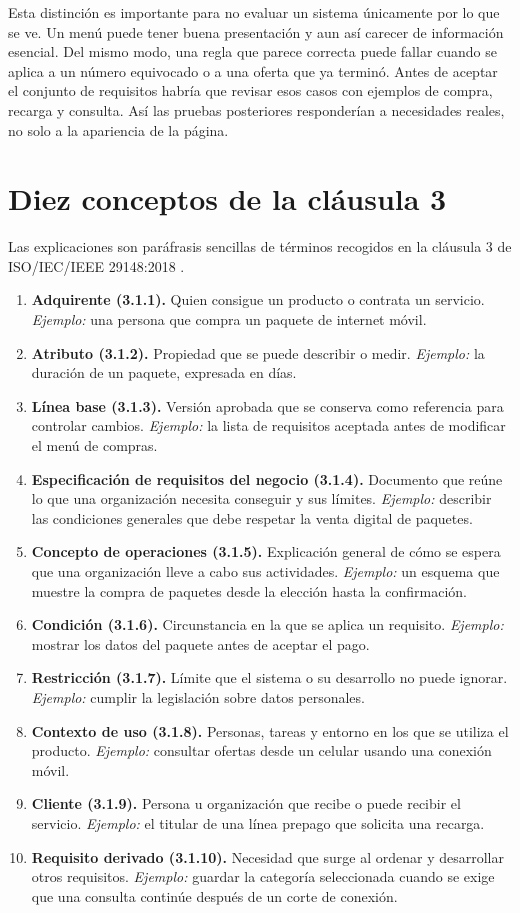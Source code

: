 \documentclass[12pt,a4paper]{article}
\begin{document}
Esta distinción es importante para no evaluar un sistema únicamente por lo que se ve. Un menú puede tener buena presentación y aun así carecer de información esencial. Del mismo modo, una regla que parece correcta puede fallar cuando se aplica a un número equivocado o a una oferta que ya terminó. Antes de aceptar el conjunto de requisitos habría que revisar esos casos con ejemplos de compra, recarga y consulta. Así las pruebas posteriores responderían a necesidades reales, no solo a la apariencia de la página.
\clearpage
\section{Diez conceptos de la cláusula 3}
Las explicaciones son paráfrasis sencillas de términos recogidos en la cláusula 3 de ISO/IEC/IEEE 29148:2018 \cite{ieee29148}.
\begin{enumerate}
\item \textbf{Adquirente (3.1.1).} Quien consigue un producto o contrata un servicio. \emph{Ejemplo:} una persona que compra un paquete de internet móvil.
\item \textbf{Atributo (3.1.2).} Propiedad que se puede describir o medir. \emph{Ejemplo:} la duración de un paquete, expresada en días.
\item \textbf{Línea base (3.1.3).} Versión aprobada que se conserva como referencia para controlar cambios. \emph{Ejemplo:} la lista de requisitos aceptada antes de modificar el menú de compras.
\item \textbf{Especificación de requisitos del negocio (3.1.4).} Documento que reúne lo que una organización necesita conseguir y sus límites. \emph{Ejemplo:} describir las condiciones generales que debe respetar la venta digital de paquetes.
\item \textbf{Concepto de operaciones (3.1.5).} Explicación general de cómo se espera que una organización lleve a cabo sus actividades. \emph{Ejemplo:} un esquema que muestre la compra de paquetes desde la elección hasta la confirmación.
\item \textbf{Condición (3.1.6).} Circunstancia en la que se aplica un requisito. \emph{Ejemplo:} mostrar los datos del paquete antes de aceptar el pago.
\item \textbf{Restricción (3.1.7).} Límite que el sistema o su desarrollo no puede ignorar. \emph{Ejemplo:} cumplir la legislación sobre datos personales.
\item \textbf{Contexto de uso (3.1.8).} Personas, tareas y entorno en los que se utiliza el producto. \emph{Ejemplo:} consultar ofertas desde un celular usando una conexión móvil.
\item \textbf{Cliente (3.1.9).} Persona u organización que recibe o puede recibir el servicio. \emph{Ejemplo:} el titular de una línea prepago que solicita una recarga.
\item \textbf{Requisito derivado (3.1.10).} Necesidad que surge al ordenar y desarrollar otros requisitos. \emph{Ejemplo:} guardar la categoría seleccionada cuando se exige que una consulta continúe después de un corte de conexión.
\end{enumerate}
\end{document}
